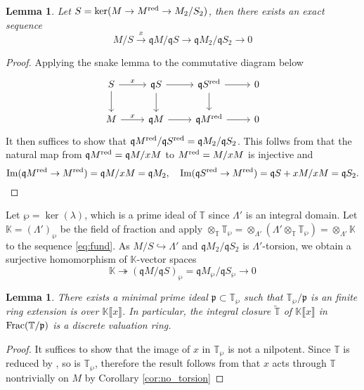 \documentclass[leqno]{amsart}
\newcommand{\TT}{\mathbb{T}} %
\newcommand{\red}{\textnormal{red}}
\newcommand{\fp}{\mathfrak{p}}
\newcommand{\fq}{\mathfrak{q}}
\DeclareMathOperator{\Image}{Im}
\newtheorem{lem}[thm]{Lemma}
\theoremstyle{definition}
\theoremstyle{remark}
\begin{document}
\begin{lem}
Let $S=\ker(M\to M^{\red}\to M_2/S_2)$,
then there exists an exact sequence
\begin{equation}\label{eq:fund}
	M/S\xrightarrow{x} \fq M/\fq S\to 
	\fq M_2/\fq S_2 \to 0
\end{equation}
\end{lem}
\begin{proof}

Applying the snake lemma to 
the commutative diagram below
\[
\begin{tikzcd}
	S\arrow[r,"x"] \arrow[d]
	& \fq S \arrow[r] \arrow[d]
	& \fq S^{\red} \arrow[r] \arrow[d] & 0\\
	M\arrow[r,"x"]
	& \fq M \arrow[r]
	& \fq M^{\red} \arrow[r] & 0
\end{tikzcd}
\]
It then suffices to show that 
$\fq M^{\red}/\fq S^{\red}=\fq M_2/\fq S_2$.
This follws from that the natural map from
$\fq M^{\red}=\fq M/xM$ to $M^{\red}=M/xM$
is injective and
\[
	\Image(\fq M^{\red}\to M^{\red})=\fq M/xM=\fq M_2,\quad
	\Image(\fq S^{\red}\to M^{\red})=\fq S+xM/xM=\fq S_2.
\]

\end{proof}

Let $\wp=\ker(\lambda)$,
which is a prime ideal of $\TT$
since $\Lambda'$ is an integral domain.
Let $\mathbb{K}=(\Lambda')_{\wp}$ 
be the field of fraction
and apply 
$\otimes_{\TT}\TT_{\wp}=
\otimes_{\Lambda'}(\Lambda'\otimes_{\TT}\TT_\wp)=
\otimes_{\Lambda'}\mathbb{K}$ 
to the sequence \eqref{eq:fund}.
As $M/S\hookrightarrow \Lambda'$
and $\fq M_2/\fq S_2$ is $\Lambda'$-torsion, 
we obtain a surjective homomorphism 
of $\mathbb{K}$-vector spaces
\begin{equation}\label{eq:fund_frac}
	\mathbb{K}\twoheadrightarrow (\fq M/\fq S)_{\wp}
	= \fq M_\wp/\fq S_\wp\to 0
\end{equation}


\begin{lem}
	There exists a minimal prime ideal
	$\fp\subset \TT_{\wp}$
	such that $\TT_{\wp}/\fp$
	is an finite ring extension
	is over $\mathbb{K}\llbracket x\rrbracket$.
	In particular,
	the integral closure $\tilde{\TT}$
	of $\mathbb{K}\llbracket x\rrbracket$
	in $\textnormal{Frac}(\TT/\fp)$
	is a discrete valuation ring.
\end{lem}
\begin{proof}
	It suffices to show that 
	the image of $x$ in  $\TT_\wp$
	is not a nilpotent.
	Since $\TT$ is reduced 
	by \cite[Lem 2.14]{ger}, 
	so is $\TT_\wp$,
	therefore the result follows from that
	$x$ acts through  $\TT$ nontrivially
	on  $M$ by Corollary \ref{cor:no_torsion}
\end{proof}
\end{document}
